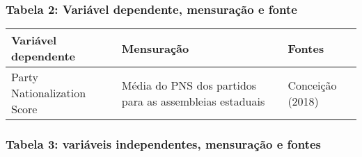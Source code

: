 \documentclass[]{article}
\begin{document}
\subsubsection{Tabela 2: Variável dependente, mensuração e
fonte}\label{tabela-2-variavel-dependente-mensuracao-e-fonte}

\begin{longtable}[]{@{}lll@{}}
\toprule
\begin{minipage}[b]{0.19\columnwidth}\raggedright\strut
\textbf{Variável dependente}\strut
\end{minipage} & \begin{minipage}[b]{0.22\columnwidth}\raggedright\strut
\textbf{Mensuração}\strut
\end{minipage} & \begin{minipage}[b]{0.15\columnwidth}\raggedright\strut
\textbf{Fontes}\strut
\end{minipage}\tabularnewline
\midrule
\endhead
\begin{minipage}[t]{0.19\columnwidth}\raggedright\strut
Party Nationalization Score\strut
\end{minipage} & \begin{minipage}[t]{0.22\columnwidth}\raggedright\strut
Média do PNS dos partidos para as assembleias estaduais\strut
\end{minipage} & \begin{minipage}[t]{0.15\columnwidth}\raggedright\strut
Conceição (2018)\strut
\end{minipage}\tabularnewline
\bottomrule
\end{longtable}

\subsubsection{Tabela 3: variáveis independentes, mensuração e
fontes}\label{tabela-3-variaveis-independentes-mensuracao-e-fontes}
\end{document}
